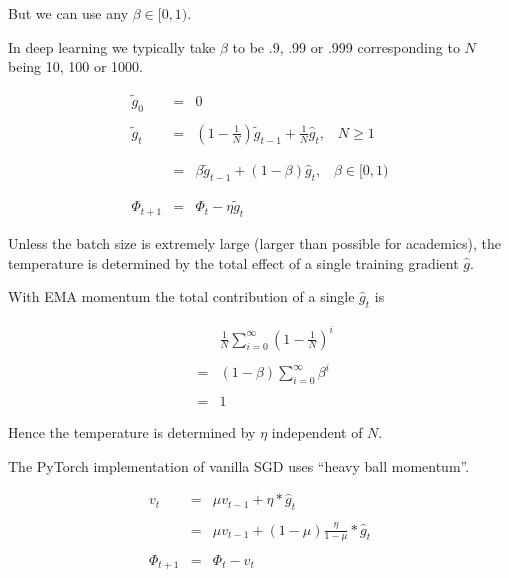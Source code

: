 {\vfill
But we can use any $\beta \in [0,1)$.

\vfill
In deep learning we typically take $\beta$ to be .9, .99 or .999 corresponding to $N$ being 10, 100 or 1000.


\begin{eqnarray*}
  \tilde{g}_0 & = & 0 \\
  \\
  \tilde{g}_{t} & = & \left(1-\frac{1}{N}\right)\tilde{g}_{t-1} + \frac{1}{N} \hat{g}_t,\;\;\;N \geq 1 \\
  \\
  \\
  & = & \beta \tilde{g}_{t-1} + (1-\beta)\hat{g}_t,\;\;\;\beta \in [0,1) \\
  \\             
  \\
  \Phi_{t+1} & =  & \Phi_t - \eta\tilde{g}_{t}
\end{eqnarray*}


Unless the batch size is extremely large (larger than possible for academics),
the temperature is determined by the total effect of a single training gradient $\hat{g}$.

\vfill
With EMA momentum the total contribution of a single $\hat{g}_t$ is

{\huge
\begin{eqnarray*}
& & \frac{1}{N} \sum_{i = 0}^\infty \left(1 - \frac{1}{N}\right)^i \\
\\
& = & (1-\beta)  \sum_{i = 0}^\infty \beta^i \\
\\
& = & 1
\end{eqnarray*}
}

\vfill
Hence the temperature is determined by $\eta$ independent of $N$.


The PyTorch implementation of vanilla SGD uses ``heavy ball momentum''.

\begin{eqnarray*}
  { v_t} & { =} & { \mu v_{t-1} + \eta * \hat{g}_t}\\
  \\
 & { =} & { \mu v_{t-1} + (1-\mu)\frac{\eta}{1-\mu} * \hat{g}_t}\\
  \\
  { \Phi_{t+1}} & { =} & { \Phi_t -  v_t} \\
\end{eqnarray*}

}
